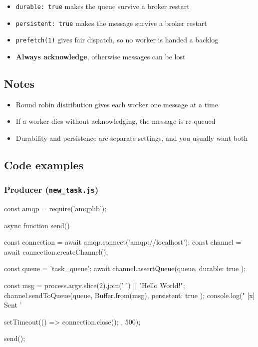 \documentclass[11pt,a4paper]{article}
\begin{document}
\begin{itemize}\itemsep2pt
  \item \lstinline|durable: true| makes the queue survive a broker restart
  \item \lstinline|persistent: true| makes the message survive a broker restart
  \item \lstinline|prefetch(1)| gives fair dispatch, so no worker is handed a backlog
  \item \textbf{Always acknowledge}, otherwise messages can be lost
\end{itemize}

\subsection*{Notes}

\begin{itemize}\itemsep2pt
  \item Round robin distribution gives each worker one message at a time
  \item If a worker dies without acknowledging, the message is re-queued
  \item Durability and persistence are separate settings, and you usually want both
\end{itemize}

\newpage
\subsection{Code examples}

\subsubsection*{Producer (\texttt{new\_task.js})}
\begin{js}
const amqp = require('amqplib');

async function send() {
    const connection = await amqp.connect('amqp://localhost');
    const channel = await connection.createChannel();

    const queue = 'task_queue';
    await channel.assertQueue(queue, { durable: true });

    const msg = process.argv.slice(2).join(' ') || "Hello World!";
    channel.sendToQueue(queue, Buffer.from(msg), { persistent: true });
    console.log(" [x] Sent '%

    setTimeout(() => { connection.close(); }, 500);
}
send();
\end{js}
\end{document}
